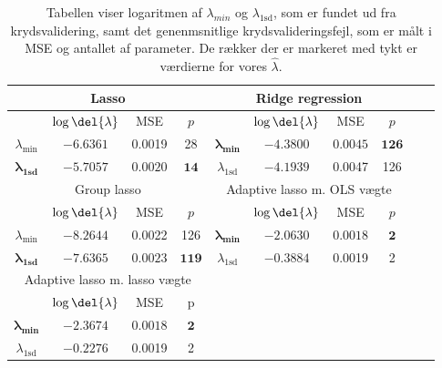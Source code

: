 \begin{table}
\center
\begin{tabular}{cccc | cccccc}
\toprule
   \multicolumn{4}{c}{Lasso} &  \multicolumn{4}{c}{Ridge regression}  \\ \midrule
 & \(\log \del{\lambda}\) & MSE & $p$ & & \(\log \del{\lambda}\) & MSE & $p$ \\
 $\lambda_{\min}$ &$-6.6361$& 0.0019 & 28 &	$\boldsymbol{\lambda_{\min}}$ &  $\mathbf{-4.3800}$ &   $\mathbf{0.0045} $&  $\mathbf{126}$ \\ 
 $\boldsymbol{\lambda}_{\textbf{1sd}}$ & $\mathbf{-5.7057}$ & $\mathbf{0.0020} $& $\mathbf{14}$ & $\lambda_{ \text{1sd}}$& $-4.1939$ & 0.0047 & 126  \\ \bottomrule \toprule
\multicolumn{4}{c}{Group lasso}  &  \multicolumn{4}{c}{Adaptive lasso m. OLS vægte}  \\ \midrule
& \(\log \del{\lambda}\) & MSE &$ p $ && \(\log \del{\lambda}\) & MSE & $p$ &  \\
$\lambda_{\min}$& $-8.2644$ & 0.0022  & 126 & $\boldsymbol{\lambda_{\min}}$  & $\mathbf{-2.0630}$ &$ \mathbf{0.0018}$ & $\mathbf{2}$ \\
  $\boldsymbol{\lambda}_{\textbf{1sd}}$  & $\mathbf{-7.6365}$ &$ \mathbf{0.0023}$ & $\mathbf{119}$ &  $\lambda_{1\text{sd}}$ & $-0.3884$ & 0.0019 & 2 \\  \bottomrule 
  \toprule
  \multicolumn{4}{c}{Adaptive lasso m. lasso vægte}  \\ \cmidrule{1-4}
& \(\log \del{\lambda}\) & MSE & p \\
$\boldsymbol{\lambda_{\min}}$   &  $ \mathbf{-2.3674}$ & $ \mathbf{0.0018} $& $ \mathbf{2}$   \\
$\lambda_{1\text{sd}}$  & $-0.2276$ & 0.0019 & 2  \\ \cmidrule{1-4}
 \end{tabular}
\caption{Tabellen viser logaritmen af $\lambda_{min}$ og $\lambda_{1\text{sd}}$, som er  fundet ud fra krydsvalidering, samt det genenmsnitlige krydsvalideringsfejl, som er målt i MSE og antallet af parameter. De rækker der er markeret med tykt er værdierne for vores $\widehat{\lambda}$.} \label{tab:cv_tab}
\end{table}
